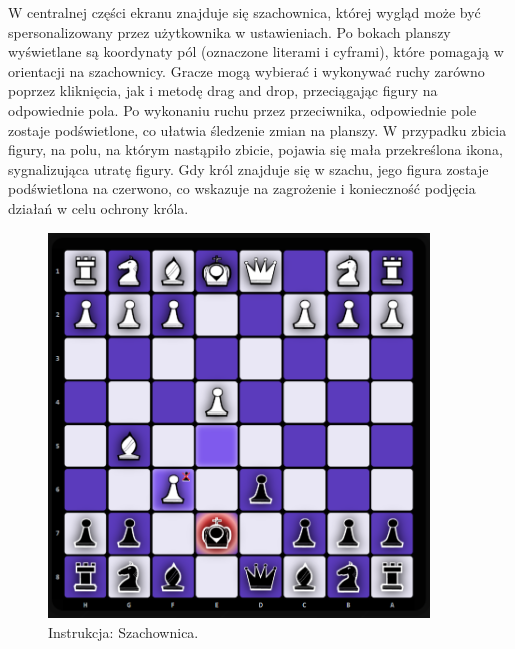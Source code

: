 \documentclass[twoside]{projektInzynierskiMS1}
\begin{document}
\newpage

\noindent
W centralnej części ekranu znajduje się szachownica, której wygląd może być spersonalizowany przez użytkownika w ustawieniach. Po bokach planszy wyświetlane są koordynaty pól (oznaczone literami i cyframi), które pomagają w orientacji na szachownicy. Gracze mogą wybierać i wykonywać ruchy zarówno poprzez kliknięcia, jak i metodę drag and drop, przeciągając figury na odpowiednie pola. Po wykonaniu ruchu przez przeciwnika, odpowiednie pole zostaje podświetlone, co ułatwia śledzenie zmian na planszy. W przypadku zbicia figury, na polu, na którym nastąpiło zbicie, pojawia się mała przekreślona ikona, sygnalizująca utratę figury. Gdy król znajduje się w szachu, jego figura zostaje podświetlona na czerwono, co wskazuje na zagrożenie i konieczność podjęcia działań w celu ochrony króla.

\vspace{1cm}
\begin{figure}[h!]
    \centering
    \includegraphics[width=0.9\textwidth]{images/ins_min_board.png}
    \caption{Instrukcja: Szachownica.}
\end{figure}

\newpage
\end{document}
